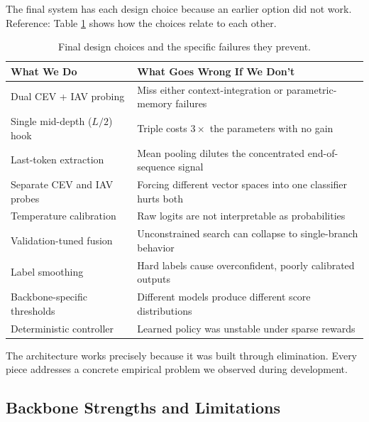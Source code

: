 The final system has each design choice because an earlier option did not work. Reference: Table \ref{tab:design_choices} shows how the choices relate to each other.

\begin{table}[!htb]
\centering
\caption{Final design choices and the specific failures they prevent.}
\label{tab:design_choices}
\begin{tabular}{@{}p{5.5cm} p{8cm}@{}}
\toprule
\textbf{What We Do} & \textbf{What Goes Wrong If We Don't} \\
\midrule
Dual CEV + IAV probing & Miss either context-integration or parametric-memory failures \\
Single mid-depth ($L/2$) hook & Triple costs $3\times$ the parameters with no gain \\
Last-token extraction & Mean pooling dilutes the concentrated end-of-sequence signal \\
Separate CEV and IAV probes & Forcing different vector spaces into one classifier hurts both \\
Temperature calibration & Raw logits are not interpretable as probabilities \\
Validation-tuned fusion & Unconstrained search can collapse to single-branch behavior \\
Label smoothing & Hard labels cause overconfident, poorly calibrated outputs \\
Backbone-specific thresholds & Different models produce different score distributions \\
Deterministic controller & Learned policy was unstable under sparse rewards \\
\bottomrule
\end{tabular}
\end{table}

The architecture works precisely because it was built through elimination. Every piece addresses a concrete empirical problem we observed during development.

\subsection{Backbone Strengths and Limitations}
\label{subsec:backbone_strengths}

